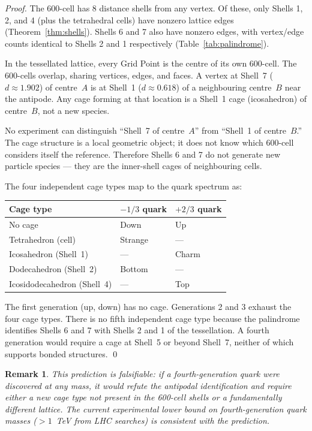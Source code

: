 \documentclass[11pt,letterpaper]{article}
\newtheorem{remark}[theorem]{Remark}
\begin{document}
\begin{proof}
The 600-cell has 8 distance shells from any vertex.  Of these, only
Shells 1, 2, and 4 (plus the tetrahedral cells) have nonzero
lattice edges (Theorem~\ref{thm:shells}).  Shells 6 and 7 also
have nonzero edges, with vertex/edge counts identical to Shells 2
and 1 respectively (Table~\ref{tab:palindrome}).

In the tessellated lattice, every Grid Point is the centre of its
own 600-cell.  The 600-cells overlap, sharing vertices, edges, and
faces.  A vertex at Shell~7 ($d \approx 1.902$) of centre~$A$ is
at Shell~1 ($d \approx 0.618$) of a neighbouring centre~$B$ near
the antipode.  Any cage forming at that location is a Shell~1 cage
(icosahedron) of centre~$B$, not a new species.

No experiment can distinguish ``Shell~7 of centre~$A$'' from
``Shell~1 of centre~$B$.''  The cage structure is a local geometric
object; it does not know which 600-cell considers itself the
reference.  Therefore Shells 6 and 7 do not generate new particle
species --- they are the inner-shell cages of neighbouring cells.

The four independent cage types map to the quark spectrum as:

\begin{center}
\begin{tabular}{lll}
\textbf{Cage type} & \textbf{$-1/3$ quark} & \textbf{$+2/3$ quark} \\
\midrule
No cage & Down & Up \\
Tetrahedron (cell) & Strange & --- \\
Icosahedron (Shell~1) & --- & Charm \\
Dodecahedron (Shell~2) & Bottom & --- \\
Icosidodecahedron (Shell~4) & --- & Top \\
\end{tabular}
\end{center}

The first generation (up, down) has no cage.  Generations 2 and 3
exhaust the four cage types.  There is no fifth independent cage
type because the palindrome identifies Shells 6 and 7 with Shells 2
and 1 of the tessellation.  A fourth generation would require a
cage at Shell~5 or beyond Shell~7, neither of which supports bonded
structures. \qed
\end{proof}

\begin{remark}
This prediction is \emph{falsifiable}: if a fourth-generation quark
were discovered at any mass, it would refute the antipodal
identification and require either a new cage type not present in
the 600-cell shells or a fundamentally different lattice.  The
current experimental lower bound on fourth-generation quark masses
($> 1$~TeV from LHC searches) is consistent with the prediction.
\end{remark}
\end{document}
